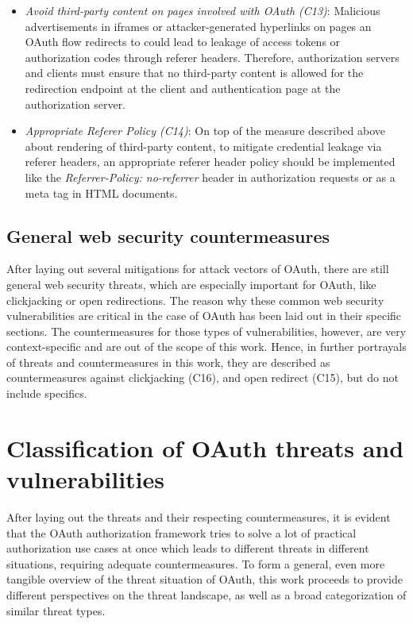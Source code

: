 \begin{itemize}
\item \emph{Avoid third-party content on pages involved with OAuth (C13)}:
\label{item:avoid3rd}
Malicious advertisements in iframes or attacker-generated hyperlinks on pages an OAuth flow redirects to could lead to leakage of access tokens or authorization codes through referer headers. Therefore, authorization servers and clients must ensure that no third-party content is allowed for the redirection endpoint at the client and authentication page at the authorization server.

\item \emph{Appropriate Referer Policy (C14)}: On top of the measure described above about rendering of third-party content, to mitigate credential leakage via referer headers, an appropriate referer header policy should be implemented like the \emph{Referrer-Policy: no-referrer} header in authorization requests or as a meta tag in HTML documents.

\end{itemize}

\subsection{General web security countermeasures}
\label{counter:C15_16}
After laying out several mitigations for attack vectors of OAuth, there are still general web security threats, which are especially important for OAuth, like clickjacking or open redirections. The reason why these common web security vulnerabilities are critical in the case of OAuth has been laid out in their specific sections. The countermeasures for those types of vulnerabilities, however, are very context-specific and are out of the scope of this work. Hence, in further portrayals of threats and countermeasures in this work, they are described as countermeasures against clickjacking (C16), and open redirect (C15), but do not include specifics.

\section{Classification of OAuth threats and vulnerabilities}
\label{sec:oauth_classification}
After laying out the threats and their respecting countermeasures, it is evident that the OAuth authorization framework tries to solve a lot of practical authorization use cases at once which leads to different threats in different situations, requiring adequate countermeasures. To form a general, even more tangible overview of the threat situation of OAuth, this work proceeds to provide different perspectives on the threat landscape, as well as a broad categorization of similar threat types.

